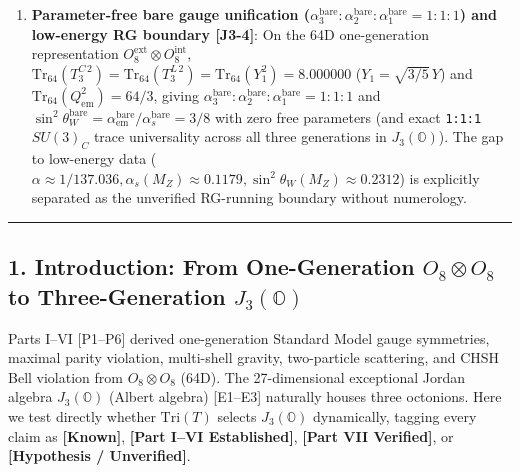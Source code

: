 \documentclass[
  a4paper,
]{article}
\begin{document}
\begin{enumerate}
  continuously
  (\texttt{0.333\ \$\textbackslash{}to\$\ 0.508\ \$\textbackslash{}to\$\ 0.685\ \$\textbackslash{}to\$\ 0.821\ \$\textbackslash{}to\$\ 1.000})
  with the initial perturbation ratio and does not universally lock to
  \(Q = 2/3\).
\item
  \textbf{Parameter-free bare gauge unification
  (\(\alpha_3^{\mathrm{bare}}:\alpha_2^{\mathrm{bare}}:\alpha_1^{\mathrm{bare}} = 1:1:1\))
  and low-energy RG boundary {[}J3-4{]}}: On the 64D one-generation
  representation \(O_8^{\mathrm{ext}}\otimes O_8^{\mathrm{int}}\),
  \(\mathrm{Tr}_{64}(T_3^{C\,2}) = \mathrm{Tr}_{64}(T_3^{L\,2}) = \mathrm{Tr}_{64}(Y_1^2) = \mathbf{8.000000}\)
  (\(Y_1 = \sqrt{3/5}\,Y\)) and
  \(\mathrm{Tr}_{64}(Q_{\mathrm{em}}^2) = 64/3\), giving
  \textbf{\(\alpha_3^{\mathrm{bare}}:\alpha_2^{\mathrm{bare}}:\alpha_1^{\mathrm{bare}} = 1:1:1\)}
  and
  \textbf{\(\sin^2\theta_W^{\mathrm{bare}} = \alpha_{\mathrm{em}}^{\mathrm{bare}}/\alpha_s^{\mathrm{bare}} = 3/8\)}
  with zero free parameters (and exact \texttt{1:1:1} \(SU(3)_C\) trace
  universality across all three generations in \(J_3(\mathbb{O})\)). The
  gap to low-energy data
  (\(\alpha \approx 1/137.036, \alpha_s(M_Z) \approx 0.1179, \sin^2\theta_W(M_Z) \approx 0.2312\))
  is explicitly separated as the unverified RG-running boundary without
  numerology.
\end{enumerate}

\begin{center}\rule{0.5\linewidth}{0.5pt}\end{center}

\subsection{\texorpdfstring{1. Introduction: From One-Generation
\(O_8 \otimes O_8\) to Three-Generation
\(J_3(\mathbb{O})\)}{1. Introduction: From One-Generation O\_8 \textbackslash otimes O\_8 to Three-Generation J\_3(\textbackslash mathbb\{O\})}}\label{introduction-from-one-generation-o_8-otimes-o_8-to-three-generation-j_3mathbbo}

Parts I--VI {[}P1--P6{]} derived one-generation Standard Model gauge
symmetries, maximal parity violation, multi-shell gravity, two-particle
scattering, and CHSH Bell violation from \(O_8 \otimes O_8\) (64D). The
27-dimensional exceptional Jordan algebra \(J_3(\mathbb{O})\) (Albert
algebra) {[}E1--E3{]} naturally houses three octonions. Here we test
directly whether \(\mathrm{Tri}(T)\) selects \(J_3(\mathbb{O})\)
dynamically, tagging every claim as \textbf{{[}Known{]}},
\textbf{{[}Part I--VI Established{]}}, \textbf{{[}Part VII Verified{]}},
or \textbf{{[}Hypothesis / Unverified{]}}.
\end{document}

